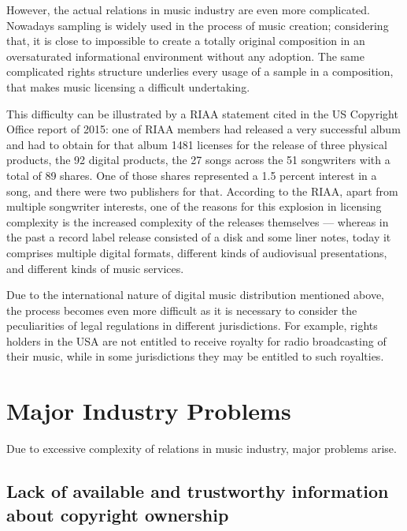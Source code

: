 \documentclass[12pt]{report}
\begin{document}
\begin{multicols}{2}
However, the actual relations in music industry are even more complicated. Nowadays sampling is widely used in the process of music creation; considering that, it is close to impossible to create a totally original composition in an oversaturated informational environment without any adoption. The same complicated rights structure underlies every usage of a sample in a composition, that makes music licensing a difficult undertaking.

This difficulty can be illustrated by a RIAA statement cited in the US Copyright Office report of 2015: one of RIAA members had released a very successful album and had to obtain for that album 1481 licenses for the release of three physical products, the 92 digital products, the 27 songs across the 51 songwriters with a total of 89 shares. One of those shares represented a 1.5 percent interest in a song, and there were two publishers for that. According to the RIAA, apart from multiple songwriter interests, one of the reasons for this explosion in licensing complexity is the increased complexity of the releases themselves — whereas in the past a record label release consisted of a disk and some liner notes, today it comprises multiple digital formats, different kinds of audiovisual presentations, and different kinds of music services.

Due to the international nature of digital music distribution mentioned above, the process becomes even more difficult as it is necessary to consider the peculiarities of legal regulations in different jurisdictions. For example, rights holders in the USA are not entitled to receive royalty for radio broadcasting of their music, while in some jurisdictions they may be entitled to such royalties.

\end{multicols}
\vfill\null\pagebreak

\section{Major Industry Problems}
\label{industry-problems}
Due to excessive complexity of relations in music industry, major problems arise.

\subsection{Lack of available and trustworthy information about copyright ownership}
\end{document}
